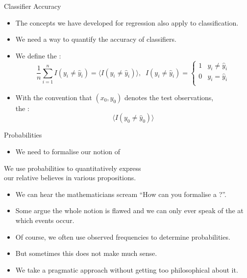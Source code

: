 \documentclass[mathserif, aspectratio=169]{beamer}
\begin{document}
\begin{frame}{Classifier Accuracy}
	\begin{itemize}
		\item The concepts we have developed for regression also apply to classification.
		\item We need a way to quantify the accuracy of classifiers.
		\item We define the :
			\[
				\frac{1}{n}\sum^n_{i=1} I(y_i \ne \hat{y}_i)
				= \langle I(y_i \ne \hat{y}_i)\rangle,
				\;\;
				 I(y_i \ne \hat{y}_i) =
				 \begin{cases}
					 1 & y_i \ne \hat{y}_i \\
					 0 & y_i = \hat{y}_i \\
				 \end{cases}
			\]
		\item With the convention that $(x_0, y_0)$ denotes the test observations,\\
			the :
			\[ \langle  I(y_0 \ne \hat{y}_0)\rangle \]
	\end{itemize}
\end{frame}

\begin{frame}{Probabilities}
	\begin{itemize}
		\item We need to formalise our notion of 
	\end{itemize}
	\begin{cpage}\orange
		We use probabilities to quantitatively express\\
		our relative believes in various propositions.
	\end{cpage}
	\begin{itemize}
		\item We can hear the mathematicians scream ``How can you formalise a ?''.
		\item Some argue the whole notion is flawed and we can only ever speak of the 
			at which events occur.
		\item Of course, we often use observed frequencies to determine probabilities.
		\item But sometimes this does not make much sense.
		\item We take a pragmatic approach without getting too philosophical about it.
	\end{itemize}
\end{frame}
\end{document}

